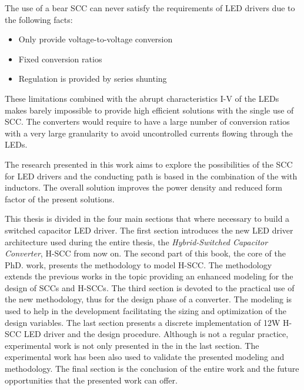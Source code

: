 The use of a bear SCC can never satisfy the requirements of LED drivers due to the following facts:
\begin{itemize}
  \item Only provide voltage-to-voltage conversion
  \item Fixed conversion ratios
  \item Regulation is provided by series shunting
\end{itemize}
These limitations combined with the abrupt characteristics I-V of the LEDs makes barely impossible to provide high efficient solutions with the single use of SCC. The converters would require to have a large number of conversion ratios with a very large granularity to avoid uncontrolled currents flowing through the LEDs.

The research presented in this work aims to explore the possibilities of the SCC for LED drivers and the conducting path is based in the combination of the with inductors. The overall solution improves the power density and reduced form factor of the present solutions.


This thesis is divided in the four main sections that where necessary to build a switched capacitor LED driver. The first section introduces the new LED driver architecture used during the entire thesis, the \emph{Hybrid-Switched Capacitor Converter}, H-SCC from now on. The second part of this book, the core of the PhD. work, presents the methodology to model H-SCC. The methodology extends the previous works in the topic providing an enhanced modeling for the design of SCCs and H-SCCs. The third section is devoted to the practical use of the new methodology, thus for the design phase of a converter. The modeling is used  to help in the development facilitating the sizing and optimization of the design variables. The last section presents a discrete implementation of 12W H-SCC LED driver and the design procedure. Although is not a regular practice, experimental work is not only presented in the in the last section. The experimental work has been also  used to validate the presented modeling and methodology. The final section is the conclusion of the entire work and the future opportunities that the presented work can offer.


 